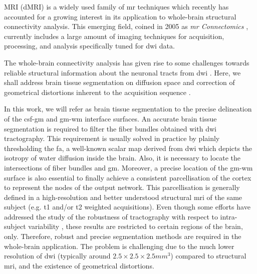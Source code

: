 \label{sec:introduction}
%
 MRI (dMRI) is a widely used family of \gls{mr} techniques
\citep{sundgren_diffusion_2004} which recently has accounted for a growing
interest in its application to whole-brain structural connectivity analysis.
This emerging field, coined in 2005 as \emph{\gls{mr} Connectomics}
\citep{hagmann_diffusion_2005,sporns_human_2005}, currently includes a
large amount of imaging techniques for acquisition, processing, and analysis
specifically tuned for \gls{dwi} data.

The whole-brain connectivity analysis has given rise to some challenges
towards reliable structural information about the neuronal tracts 
from \gls{dwi} \cite{johansen-berg_using_2009,jones_white_2012}. 
Here, we shall address brain tissue segmentation on diffusion space 
and correction of geometrical distortions inherent to the acquisition 
sequence \citep{hagmann_mr_2012}.

In this work, we will refer as brain tissue segmentation to the precise
delineation of the \gls{csf}-\gls{gm} and \gls{gm}-\gls{wm} interface surfaces.
An accurate brain tissue segmentation is required
to filter the fiber bundles obtained with \gls{dwi} tractography. 
This requirement is usually solved in practice by plainly thresholding the 
\gls{fa}, a well-known scalar map derived from \gls{dwi} which depicts 
the isotropy of water diffusion inside the brain. Also,
it is necessary to locate the intersections of fiber bundles and \gls{gm}.
Moreover, a precise location of the \gls{gm}-\gls{wm} surface is also essential 
to finally achieve a consistent parcellisation of the cortex 
to represent the nodes of the output network. This parcellisation 
is generally defined in a high-resolution and better understood structural 
\gls{mri} of the same 
subject (e.g. \gls{t1} and/or \gls{t2} weighted acquisitions). Even though
some efforts have addressed the study of the robustness of tractography with
respect to intra-subject variability \cite{heiervang_between_2006,
wakana_reproducibility_2007}, these results are restricted to certain regions 
of the brain, only. Therefore, robust and precise segmentation methods are 
required in the whole-brain application. The problem is challenging due to
the much lower resolution of \gls{dwi} (typically around 
$2.5\times2.5\times2.5mm^3$) compared to structural \gls{mri}, and the
existence of geometrical distortions.

